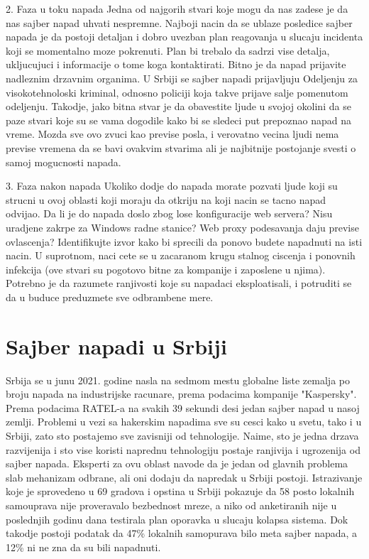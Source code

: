 \documentclass[a4paper]{article}
\begin{document}
{2. Faza u toku napada
Jedna od najgorih stvari koje mogu da nas zadese je da nas sajber napad uhvati nespremne. Najboji nacin da se ublaze posledice sajber napada je da postoji detaljan i dobro uvezban plan reagovanja u slucaju incidenta koji se momentalno moze pokrenuti. Plan bi trebalo da sadrzi vise detalja, ukljucujuci i informacije o tome koga kontaktirati. Bitno je da napad prijavite nadleznim drzavnim organima. U Srbiji se sajber napadi prijavljuju Odeljenju za visokotehnoloski kriminal, odnosno policiji koja takve prijave salje pomenutom odeljenju. Takodje, jako bitna stvar je da obavestite ljude u svojoj okolini da se paze stvari koje su se vama dogodile kako bi se sledeci put prepoznao napad na vreme. Mozda sve ovo zvuci kao previse posla, i verovatno vecina ljudi nema previse vremena da se bavi ovakvim stvarima ali je najbitnije postojanje svesti o samoj mogucnosti napada.

3. Faza nakon napada
Ukoliko dodje do napada morate pozvati ljude koji su strucni u ovoj oblasti koji moraju da otkriju na koji nacin se tacno napad odvijao. Da li je do napada doslo zbog lose konfiguracije web servera? Nisu uradjene zakrpe za Windows radne stanice? Web proxy podesavanja daju previse ovlascenja? Identifikujte izvor kako bi sprecili da ponovo budete napadnuti na isti nacin. U suprotnom, naci cete se u zacaranom krugu stalnog ciscenja i ponovnih infekcija (ove stvari su pogotovo bitne za kompanije i zaposlene u njima). Potrebno je da razumete ranjivosti koje su napadaci eksploatisali, i potruditi se da u buduce preduzmete sve odbrambene mere.

\section{Sajber napadi u Srbiji}

Srbija se u junu 2021. godine nasla na sedmom mestu globalne liste zemalja po broju napada na industrijske racunare, prema podacima kompanije "Kaspersky". Prema podacima RATEL-a na svakih 39 sekundi desi jedan sajber napad u nasoj zemlji.
Problemi u vezi sa hakerskim napadima sve su cesci kako u svetu, tako i u Srbiji, zato sto postajemo sve zavisniji od tehnologije. Naime, sto je jedna drzava razvijenija i sto vise koristi naprednu tehnologiju postaje ranjivija i ugrozenija od sajber napada.
Eksperti za ovu oblast navode da je jedan od glavnih problema slab mehanizam odbrane, ali  oni dodaju da napredak u Srbiji postoji. 
Istrazivanje koje je sprovedeno u 69 gradova i opstina u Srbiji pokazuje da 58 posto lokalnih samouprava nije proveravalo bezbednost mreze, a niko od anketiranih nije u poslednjih godinu dana testirala plan oporavka u slucaju kolapsa sistema. Dok takodje postoji podatak da 47\% lokalnih samopurava bilo meta sajber napada, a 12\% ni ne zna da su bili napadnuti.  

}
\end{document}
